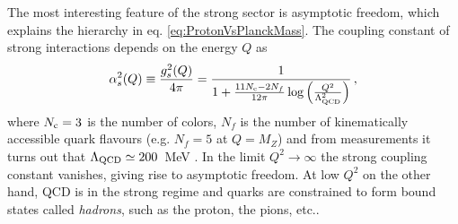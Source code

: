 \documentclass[12pt,a4paper]{book}
\begin{document}
The most interesting feature of the strong sector is asymptotic freedom, which explains the hierarchy in eq. \eqref{eq:ProtonVsPlanckMass}. The coupling constant of strong interactions depends on the energy $Q$ as
\begin{align}
\label{eq:StrongCouplingRunning}
\alpha^2_s (Q) \equiv \frac{g_s^2 (Q)}{4 \pi} = \frac{1}{1 + \frac{11 N_{\rm c} - 2 N_{f}}{12 \pi} \log \left(\frac{Q^2}{\Lambda_{\rm QCD}^2}\right)} \,,
\end{align}
where $N_{\rm c} = 3$ is the number of colors, $N_f$ is the number of kinematically accessible quark flavours (e.g. $N_f = 5$ at $Q = M_Z$) and from measurements it turns out that $\Lambda_{\rm QCD} \simeq 200 \,$ MeV \cite{Agashe:2014kda}. In the limit $Q^2 \rightarrow \infty$ the strong coupling constant vanishes, giving rise to asymptotic freedom. At low $Q^2$ on the other hand, QCD is in the strong regime and quarks are constrained to form bound states called \textit{hadrons}, such as the proton, the pions, etc..\\
\end{document}
